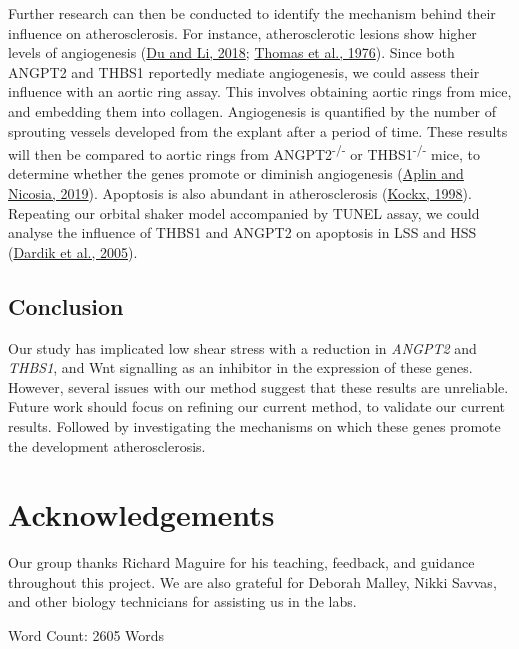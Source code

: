 \documentclass[
  11pt,
]{article}
\begin{document}
Further research can then be conducted to identify the mechanism behind their influence on atherosclerosis.
For instance, atherosclerotic lesions show higher levels of angiogenesis (\protect\hyperlink{ref-du2018}{Du and Li, 2018}; \protect\hyperlink{ref-thomas1976}{Thomas et al., 1976}).
Since both ANGPT2 and THBS1 reportedly mediate angiogenesis, we could assess their influence with an aortic ring assay.
This involves obtaining aortic rings from mice, and embedding them into collagen.
Angiogenesis is quantified by the number of sprouting vessels developed from the explant after a period of time.
These results will then be compared to aortic rings from ANGPT2\textsuperscript{-/-} or THBS1\textsuperscript{-/-} mice, to determine whether the genes promote or diminish angiogenesis (\protect\hyperlink{ref-Aplin2019}{Aplin and Nicosia, 2019}).
Apoptosis is also abundant in atherosclerosis (\protect\hyperlink{ref-kockx1998}{Kockx, 1998}).
Repeating our orbital shaker model accompanied by TUNEL assay, we could analyse the influence of THBS1 and ANGPT2 on apoptosis in LSS and HSS (\protect\hyperlink{ref-Dardik2005}{Dardik et al., 2005}).

\hypertarget{conclusion}{%
\subsection{Conclusion}\label{conclusion}}

Our study has implicated low shear stress with a reduction in \emph{ANGPT2} and \emph{THBS1}, and Wnt signalling as an inhibitor in the expression of these genes.
However, several issues with our method suggest that these results are unreliable.
Future work should focus on refining our current method, to validate our current results.
Followed by investigating the mechanisms on which these genes promote the development atherosclerosis.

\hypertarget{acknowledgements}{%
\section{Acknowledgements}\label{acknowledgements}}

Our group thanks Richard Maguire for his teaching, feedback, and guidance throughout this project.
We are also grateful for Deborah Malley, Nikki Savvas, and other biology technicians for assisting us in the labs.

\begin{flushright}
Word Count: 2605 Words
\end{flushright}
\end{document}
